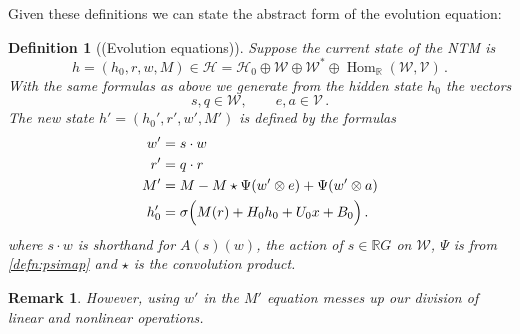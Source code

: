 \documentclass[english,letter paper,12pt,leqno]{article}
\theoremstyle{example}
\newtheorem{definition}[theorem]{Definition}
\newtheorem{remark}[theorem]{Remark}
\numberwithin{equation}{section}
\def\Hom{\operatorname{Hom}}
\begin{document}

Given these definitions we can state the abstract form of the evolution equation:

\begin{definition}[(Evolution equations)] Suppose the current state of the NTM is
\[
h = (h_0, r, w, M) \in \mathscr{H} = \mathscr{H}_0 \oplus \mathscr{W} \oplus \mathscr{W}^* \oplus \Hom_{\mathbb{R}}(\mathscr{W},\mathscr{V})\,.
\]
With the same formulas as above we generate from the hidden state $h_0$ the vectors
\[
s,q \in \mathscr{W}, \qquad e,a \in \mathscr{V}\,.
\]
The new state $h' = (h_0', r', w', M')$ is defined by the formulas
\begin{align}
w' &= s \cdot w
\\
r' &= q \cdot r\\
M' &= M - M \star \Psi( w' \otimes e ) + \Psi(w' \otimes a)\\
h_0' &= \sigma\Big( M(r) + H_0 h_0 + U_0 x + B_0 \Big)\,.
\end{align}
where $s \cdot w$ is shorthand for $A(s)(w)$, the action of $s \in \mathbb{R}G$ on $\mathscr{W}$, $\Psi$ is from \eqref{defn:psimap} and $\star$ is the convolution product.
\end{definition}

\begin{remark} However, using $w'$ in the $M'$ equation messes up our division of linear and nonlinear operations.
\end{remark}
\end{document}

